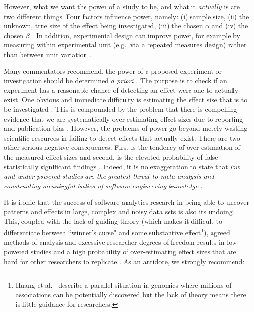 \documentclass[10pt]{elsarticle}
\newcommand{\RED}{\color{black}}
\newcommand{\BLACK}{\color{black}}
\begin{document}
\RED However, what we want the power of a study to be, and what it \textit{actually} is are two different things.  
\BLACK 
Four factors influence power, namely: (i) sample size, (ii) the unknown, true size of the effect being investigated, (iii) the chosen $\alpha$ and (iv) the chosen $\beta$ \cite{Cohe92,Elli10}.  In addition, experimental design can improve power, for example by measuring within experimental unit (e.g., via a repeated measures design) rather than between unit variation \cite{McCl00}.  

Many commentators recommend, the power of a proposed experiment or investigation should be determined \emph{a priori} \cite{Dyba06}.  The purpose is to check if an experiment has a reasonable chance of detecting an effect were one to actually exist.  One obvious and immediate difficulty is estimating the effect size that is to be investigated \cite{Maxw08}.  This is compounded by the problem that there is compelling evidence that we are systematically over-estimating effect sizes due to reporting and publication bias \cite{Butt13,Jorg16}.  However, the problems of power go beyond merely wasting scientific resources in failing to detect effects that actually exist.  There are two other serious negative consequences.  First is the tendency of over-estimation of the measured effect sizes and second, is the elevated probability of false statistically significant findings \cite{Ioan05,Colq14}.  Indeed, it is no exaggeration to state that \textit{low and under-powered studies are the greatest threat to meta-analysis and constructing meaningful bodies of software engineering knowledge} \cite{Butt13,Szuc17}.

It is ironic that the success of software analytics research in being able to uncover patterns and effects in large, complex and noisy data sets is also its undoing.  This, coupled with the lack of guiding theory (which makes it difficult to differentiate between ``winner's curse" and some substantive effect\footnote{\RED Huang et al.~\cite{Huan17} describe a parallel situation in genomics where millions of associations can be potentially discovered but the lack of theory means there is little guidance for researchers. \BLACK}), agreed methods of analysis and excessive researcher degrees of freedom \cite{Silb15,Loke17} results in low-powered studies and a high probability of over-estimating effect sizes that are hard for other researchers to replicate \cite{Ioan05,Shep14,Jorg16}.  As an antidote, we strongly recommend:
\end{document}
